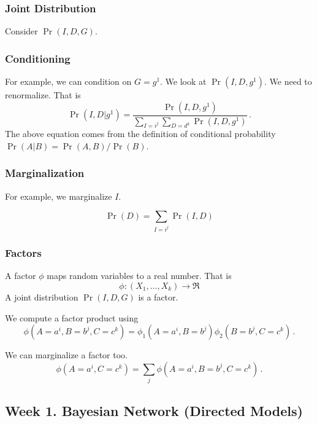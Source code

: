\documentclass[12pt]{article}
\begin{document}


\subsubsection{Joint Distribution}
Consider $\Pr(I, D, G)$.

\subsubsection{Conditioning}
For example, we can condition on $G=g^1$.  We look at $\Pr(I, D, g^1)$.
We need to renormalize. That is
\begin{equation*}
  \Pr(I, D | g^1) = \frac{\Pr(I, D, g^1)}
                         {\sum_{I=i^j} \sum_{D=d^k} \Pr(I, D, g^1)}  \, .
\end{equation*}
The above equation comes from the definition of conditional probability $\Pr(A | B) = \Pr(A, B) / \Pr(B)$.

\subsubsection{Marginalization}
For example, we marginalize $I$.

\begin{equation*}
  \Pr(D) = \sum_{I=i^j} \Pr(I, D)
\end{equation*}


\subsubsection{Factors}
A factor $\phi$ maps random variables to a real number. That is
\begin{equation*}
  \phi : (X_1, \ldots, X_k) \rightarrow \Re
\end{equation*}
A joint distribution $\Pr(I, D, G)$ is a factor.

We compute a factor product using
\begin{equation*}
  \phi(A=a^i, B=b^j, C=c^k) = \phi_1(A=a^i, B=b^j) \phi_2(B=b^j, C=c^k) \, .
\end{equation*}

We can marginalize a factor too.
\begin{equation*}
  \phi(A=a^i, C=c^k) = \sum_j \phi(A=a^i, B=b^j, C=c^k) \,.
\end{equation*}




\subsection{Week 1. Bayesian Network (Directed Models)}
\end{document}
